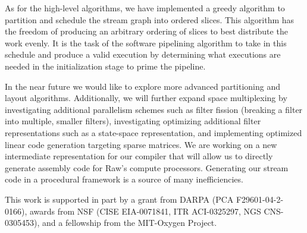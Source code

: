 \documentclass{csailabstractbook}
\begin{document}
As for the high-level algorithms, we have implemented a greedy
algorithm to partition and schedule the stream graph into ordered slices.
This algorithm has the freedom of producing an arbitrary ordering of slices
to best distribute the work evenly. It is the task of the software
pipelining algorithm to take in this schedule and produce a valid
execution by determining what executions are needed in the initialization
stage to prime the pipeline.

In the near future we would like to explore more advanced partitioning
and layout algorithms.  Additionally, we will further expand space
multiplexing by investigating additional parallelism schemes such as
filter fission (breaking a filter into multiple, smaller filters),
investigating optimizing additional filter representations such as a
state-space representation, and implementing optimized linear code
generation targeting sparse matrices.  We are working on a new
intermediate representation for our compiler that will allow us to
directly generate assembly code for Raw's compute
processors. Generating our stream code in a procedural framework is a
source of many inefficiencies.
 

This work is supported in part by a grant from DARPA (PCA
F29601-04-2-0166), awards from NSF (CISE EIA-0071841, ITR ACI-0325297,
NGS CNS-0305453), and a fellowship from the MIT-Oxygen Project.


\end{document}
